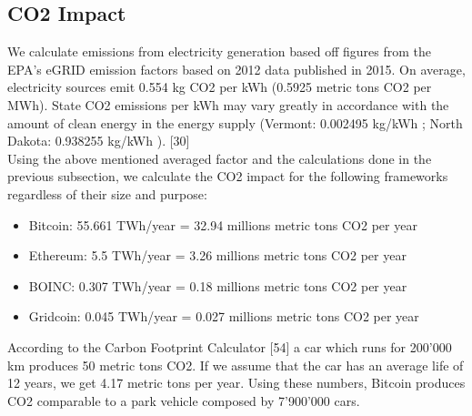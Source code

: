 \subsection{CO2 Impact}

We calculate emissions from electricity generation based off figures from the EPA’s eGRID emission factors based on 2012 data published in 2015.  On average, electricity sources emit 0.554 kg CO2 per kWh (0.5925 metric tons CO2 per MWh). State CO2 emissions per kWh may vary greatly in accordance with the amount of clean energy in the energy supply (Vermont: 0.002495 kg/kWh ; North Dakota: 0.938255 kg/kWh ). [30]\\

Using the above mentioned averaged factor and the calculations done in the previous subsection, we calculate the CO2 impact for the following frameworks regardless of their size and purpose:

\begin{itemize}
  \item Bitcoin: 55.661 TWh/year = 32.94 millions metric tons CO2 per year
  \item Ethereum: 5.5 TWh/year = 3.26 millions metric tons CO2 per year
  \item BOINC: 0.307 TWh/year = 0.18 millions metric tons CO2 per year
  \item Gridcoin: 0.045 TWh/year =  0.027 millions metric tons CO2 per year
\end{itemize}

According to the Carbon Footprint Calculator [54] a car which runs for 200'000 km produces 50 metric tons CO2. If we assume that the car has an average life of 12 years, we get 4.17 metric tons per year. Using these numbers, Bitcoin produces CO2 comparable to a park vehicle composed by 7'900'000 cars. 


 